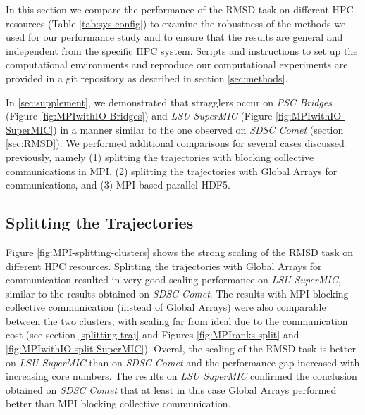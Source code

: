 \label{sec:clusters}

In this section we compare the performance of the RMSD task on different HPC resources (Table \ref{tab:sys-config}) to examine the robustness of the methods we used for our performance study and to ensure that the results are general and independent from the specific HPC system.
Scripts and instructions to set up the computational environments and reproduce our computational experiments are provided in a git repository as described in section \ref{sec:methods}.

In \ref{sec:supplement}, we demonstrated that stragglers occur on \emph{PSC Bridges} (Figure \ref{fig:MPIwithIO-Bridges}) and \emph{LSU SuperMIC} (Figure \ref{fig:MPIwithIO-SuperMIC}) in a manner similar to the one observed on \emph{SDSC Comet} (section \ref{sec:RMSD}).
We performed additional comparisons for several cases discussed previously, namely (1) splitting the trajectories with blocking collective communications in MPI, (2) splitting the trajectories with Global Arrays for communications, and (3) MPI-based parallel HDF5.

\subsection{Splitting the Trajectories}
Figure \ref{fig:MPI-splitting-clusters} shows the strong scaling of the RMSD task on different HPC resources.  
Splitting the trajectories with Global Arrays for communication resulted in very good scaling performance on \emph{LSU SuperMIC}, similar to the results obtained on \emph{SDSC Comet}.
The results with MPI blocking collective communication (instead of Global Arrays) were also comparable between the two clusters, with scaling far from ideal due to the communication cost (see section \ref{splitting-traj} and Figures \ref{fig:MPIranks-split} and \ref{fig:MPIwithIO-split-SuperMIC}). 
Overal, the scaling of the RMSD task is better on \emph{LSU SuperMIC} than on \emph{SDSC Comet} and the performance gap increased with increasing core numbers.
The results on \emph{LSU SuperMIC} confirmed the conclusion obtained on \emph{SDSC Comet} that at least in this case Global Arrays performed better than MPI blocking collective communication.

